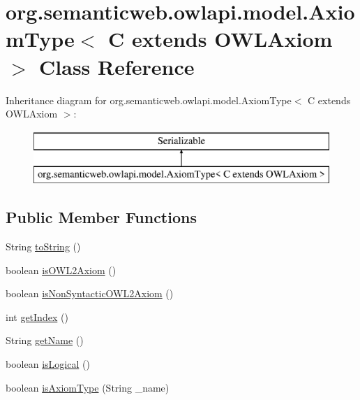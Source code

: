 \hypertarget{classorg_1_1semanticweb_1_1owlapi_1_1model_1_1_axiom_type_3_01_c_01extends_01_o_w_l_axiom_01_4}{\section{org.\-semanticweb.\-owlapi.\-model.\-Axiom\-Type$<$ C extends O\-W\-L\-Axiom $>$ Class Reference}
\label{classorg_1_1semanticweb_1_1owlapi_1_1model_1_1_axiom_type_3_01_c_01extends_01_o_w_l_axiom_01_4}
}
Inheritance diagram for org.\-semanticweb.\-owlapi.\-model.\-Axiom\-Type$<$ C extends O\-W\-L\-Axiom $>$\-:\begin{figure}[H]
\begin{center}
\leavevmode
\includegraphics[height=2.000000cm]{classorg_1_1semanticweb_1_1owlapi_1_1model_1_1_axiom_type_3_01_c_01extends_01_o_w_l_axiom_01_4}
\end{center}
\end{figure}
\subsection*{Public Member Functions}
\begin{DoxyCompactItemize}
\item 
String \hyperlink{classorg_1_1semanticweb_1_1owlapi_1_1model_1_1_axiom_type_3_01_c_01extends_01_o_w_l_axiom_01_4_a132102961b896e0b694aca5ca4ed303c}{to\-String} ()
\item 
boolean \hyperlink{classorg_1_1semanticweb_1_1owlapi_1_1model_1_1_axiom_type_3_01_c_01extends_01_o_w_l_axiom_01_4_a581c7fc4441e5fe57e3fea01a1c0e324}{is\-O\-W\-L2\-Axiom} ()
\item 
boolean \hyperlink{classorg_1_1semanticweb_1_1owlapi_1_1model_1_1_axiom_type_3_01_c_01extends_01_o_w_l_axiom_01_4_a80f5aca09b4c75c50c9cbfa04e45ab03}{is\-Non\-Syntactic\-O\-W\-L2\-Axiom} ()
\item 
int \hyperlink{classorg_1_1semanticweb_1_1owlapi_1_1model_1_1_axiom_type_3_01_c_01extends_01_o_w_l_axiom_01_4_a8193efe8f61d1a858a80d2df980531bb}{get\-Index} ()
\item 
String \hyperlink{classorg_1_1semanticweb_1_1owlapi_1_1model_1_1_axiom_type_3_01_c_01extends_01_o_w_l_axiom_01_4_ad6003147f6768e4e76d808ddeb233727}{get\-Name} ()
\item 
boolean \hyperlink{classorg_1_1semanticweb_1_1owlapi_1_1model_1_1_axiom_type_3_01_c_01extends_01_o_w_l_axiom_01_4_a6816e3cc11b2676a64e76a73f3c7d07c}{is\-Logical} ()
\item 
boolean \hyperlink{classorg_1_1semanticweb_1_1owlapi_1_1model_1_1_axiom_type_3_01_c_01extends_01_o_w_l_axiom_01_4_a3f1b4f932eebb022b11600846fc8b14f}{is\-Axiom\-Type} (String \-\_\-name)
\end{DoxyCompactItemize}
